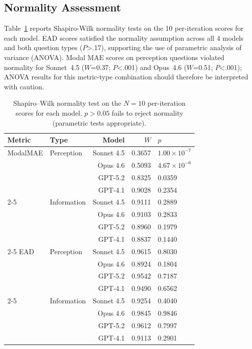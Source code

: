 \subsection{Normality Assessment}

Table~\ref{tab:shapiro} reports Shapiro-Wilk normality tests on the 10
per-iteration scores for each model. EAD scores satisfied the normality
assumption across all 4 models and both question types ($P$>.17),
supporting the use of parametric analysis of variance (ANOVA). Modal MAE
scores on perception questions violated normality for Sonnet~4.5
($W$=0.37; $P$<.001) and Opus~4.6 ($W$=0.51; $P$<.001);
ANOVA results for this metric-type combination should therefore be interpreted
with caution.

\begin{table}[htbp]
\centering
\scriptsize
\setlength{\tabcolsep}{4pt}
\caption{Shapiro--Wilk normality test on the $N{=}10$ per-iteration scores for each model. $p > 0.05$ fails to reject normality (parametric tests appropriate).}
\label{tab:shapiro}
\begin{tabular}{llrrl}
\toprule
\textbf{Metric} & \textbf{Type} & \textbf{Model} & $W$ & $p$ \\
\midrule
ModalMAE & Perception & Sonnet 4.5 & 0.3657 & $1.00\times 10^{-7}$ \\
 &  & Opus 4.6 & 0.5093 & $4.67\times 10^{-6}$ \\
 &  & GPT-5.2 & 0.8325 & 0.0359 \\
 &  & GPT-4.1 & 0.9028 & 0.2354 \\
\cmidrule(lr){2-5}
 & Information & Sonnet 4.5 & 0.9111 & 0.2889 \\
 &  & Opus 4.6 & 0.9103 & 0.2833 \\
 &  & GPT-5.2 & 0.8960 & 0.1979 \\
 &  & GPT-4.1 & 0.8837 & 0.1440 \\
\cmidrule(lr){2-5}
EAD & Perception & Sonnet 4.5 & 0.9615 & 0.8030 \\
 &  & Opus 4.6 & 0.8924 & 0.1804 \\
 &  & GPT-5.2 & 0.9542 & 0.7187 \\
 &  & GPT-4.1 & 0.9490 & 0.6562 \\
\cmidrule(lr){2-5}
 & Information & Sonnet 4.5 & 0.9254 & 0.4040 \\
 &  & Opus 4.6 & 0.9845 & 0.9846 \\
 &  & GPT-5.2 & 0.9612 & 0.7997 \\
 &  & GPT-4.1 & 0.9113 & 0.2901 \\
\midrule
\bottomrule
\end{tabular}
\end{table}

